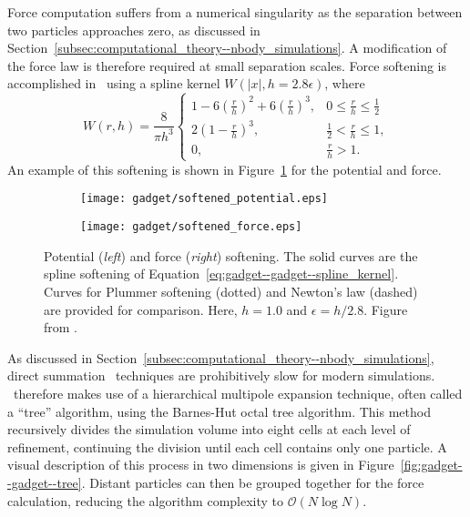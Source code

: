 Force computation suffers from a numerical singularity as the separation between two particles approaches zero, as discussed in Section~\ref{subsec:computational_theory--nbody_simulations}.  A modification of the force law is therefore required at small separation scales.  Force softening is accomplished in \gadgettwo\ using a spline kernel \citep{1985A&A...149..135M} $W(|x|, h = 2.8 \epsilon)$, where
\begin{equation} \label{eq:gadget--gadget--spline_kernel}
	W(r,h) = \frac{8}{\pi h^{3}}
	\begin{cases}
		1 - 6 \left( \frac{r}{h} \right)^{2} + 6 \left( \frac{r}{h} \right)^{3}, & 0 \leq \frac{r}{h} \leq \frac{1}{2} \\
		2 \left( 1 - \frac{r}{h} \right)^{3},                                    & \frac{1}{2} < \frac{r}{h} \leq 1, \\
		0,                                                                       & \frac{r}{h} > 1.
	\end{cases}
\end{equation}
An example of this softening is shown in Figure~\ref{fig:gadget--gadget--softening} for the potential and force.

\begin{figure}[t]
	\centering
	\begin{subfigure}{}
		\texttt{[image: gadget/softened\_potential.eps]}
	\end{subfigure}
	\begin{subfigure}{}
		\texttt{[image: gadget/softened\_force.eps]}
	\end{subfigure}
	\caption[Potential and force softening.]{\footnotesize Potential (\emph{left}) and force (\emph{right}) softening.  The solid curves are the spline softening of Equation~\ref{eq:gadget--gadget--spline_kernel}.  Curves for Plummer softening (dotted) and Newton's law (dashed) are provided for comparison.  Here, $h = 1.0$ and $\epsilon = h/2.8$.  Figure from \citet{2001NewA....6...79S}.}
	\label{fig:gadget--gadget--softening}
\end{figure}

As discussed in Section~\ref{subsec:computational_theory--nbody_simulations}, direct summation \nbody\ techniques are prohibitively slow for modern simulations.  \gadgettwo\ therefore makes use of a hierarchical multipole expansion technique, often called a ``tree'' algorithm, using the Barnes-Hut octal tree \citep{1986Natur.324..446B} algorithm.  This method recursively divides the simulation volume into eight cells at each level of refinement, continuing the division until each cell contains only one particle.  A visual description of this process in two dimensions is given in Figure~\ref{fig:gadget--gadget--tree}.  Distant particles can then be grouped together for the force calculation, reducing the algorithm complexity to $\mathcal{O} (N \log N)$.

